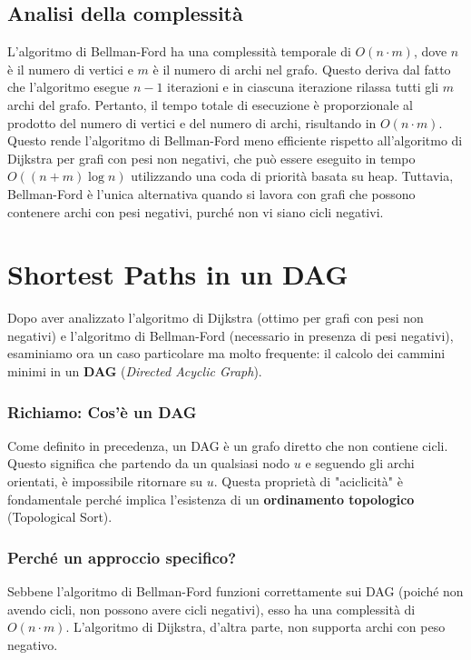 \clearpage
\subsection*{Analisi della complessità}
L'algoritmo di Bellman-Ford ha una complessità temporale di $O(n \cdot m)$, dove $n$ è il numero di vertici e $m$ è il numero di archi nel grafo. Questo deriva dal fatto che l'algoritmo esegue $n-1$ iterazioni e in ciascuna iterazione rilassa tutti gli $m$ archi del grafo. Pertanto, il tempo totale di esecuzione è proporzionale al prodotto del numero di vertici e del numero di archi, risultando in $O(n \cdot m)$. Questo rende l'algoritmo di Bellman-Ford meno efficiente rispetto all'algoritmo di Dijkstra per grafi con pesi non negativi, che può essere eseguito in tempo $O((n + m) \log n)$ utilizzando una coda di priorità basata su heap. Tuttavia, Bellman-Ford è l'unica alternativa quando si lavora con grafi che possono contenere archi con pesi negativi, purché non vi siano cicli negativi.


\section{Shortest Paths in un DAG}
Dopo aver analizzato l'algoritmo di Dijkstra (ottimo per grafi con pesi non negativi) e l'algoritmo di Bellman-Ford (necessario in presenza di pesi negativi), esaminiamo ora un caso particolare ma molto frequente: il calcolo dei cammini minimi in un \textbf{DAG} (\textit{Directed Acyclic Graph}).

\subsubsection{Richiamo: Cos'è un DAG}
Come definito in precedenza, un DAG è un grafo diretto che non contiene cicli. Questo significa che partendo da un qualsiasi nodo $u$ e seguendo gli archi orientati, è impossibile ritornare su $u$. Questa proprietà di "aciclicità" è fondamentale perché implica l'esistenza di un \textbf{ordinamento topologico} (Topological Sort).

\subsubsection{Perché un approccio specifico?}
Sebbene l'algoritmo di Bellman-Ford funzioni correttamente sui DAG (poiché non avendo cicli, non possono avere cicli negativi), esso ha una complessità di $O(n \cdot m)$. L'algoritmo di Dijkstra, d'altra parte, non supporta archi con peso negativo.

